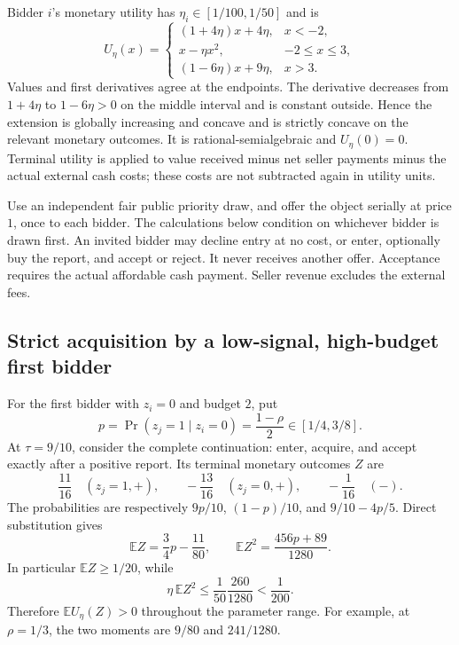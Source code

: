 \documentclass[11pt,a4paper]{article}
\numberwithin{equation}{section}
\theoremstyle{definition}
\newcommand{\E}{\mathbb E}
\begin{document}
Bidder \(i\)'s monetary utility has
\(\eta_i\in[1/100,1/50]\) and is
\begin{equation}\label{eq:utilityexample}
 U_\eta(x)=
 \begin{cases}
  (1+4\eta)x+4\eta,&x<-2,\\
  x-\eta x^2,&-2\le x\le3,\\
  (1-6\eta)x+9\eta,&x>3.
 \end{cases}
\end{equation}
Values and first derivatives agree at the endpoints.
The derivative decreases from \(1+4\eta\) to \(1-6\eta>0\) on
the middle interval and is constant outside.
Hence the extension is globally increasing and concave and is
strictly concave on the relevant monetary outcomes.
It is rational-semialgebraic and \(U_\eta(0)=0\).
Terminal utility is applied to value received minus net seller payments
minus the actual external cash costs; these costs are not subtracted
again in utility units.

Use an independent fair public priority draw, and offer the object
serially at price \(1\), once to each bidder.
The calculations below condition on whichever bidder is drawn first.
An invited bidder may decline entry at no cost, or enter, optionally
buy the report, and accept or reject.
It never receives another offer.
Acceptance requires the actual affordable cash payment.
Seller revenue excludes the external fees.

\subsection{Strict acquisition by a low-signal, high-budget first bidder}
For the first bidder with \(z_i=0\) and budget \(2\), put
\[
 p=\Pr(z_j=1\mid z_i=0)=\frac{1-\rho}{2}\in[1/4,3/8].
\]
At \(\tau=9/10\), consider the complete continuation:
enter, acquire, and accept exactly after a positive report.
Its terminal monetary outcomes \(Z\) are
\[
 \frac{11}{16}\quad(z_j=1,+),\qquad
 -\frac{13}{16}\quad(z_j=0,+),\qquad
 -\frac1{16}\quad(-).
\]
The probabilities are respectively \(9p/10\),
\((1-p)/10\), and \(9/10-4p/5\).
Direct substitution gives
\begin{equation}\label{eq:acquisitionmoments}
 \E Z=\frac34p-\frac{11}{80},\qquad
 \E Z^2=\frac{456p+89}{1280}.
\end{equation}
In particular \(\E Z\ge1/20\), while
\[
 \eta\,\E Z^2
 \le\frac1{50}\frac{260}{1280}<\frac1{200}.
\]
Therefore \(\E U_\eta(Z)>0\) throughout the parameter range.
For example, at \(\rho=1/3\), the two moments are
\(9/80\) and \(241/1280\).
\end{document}
